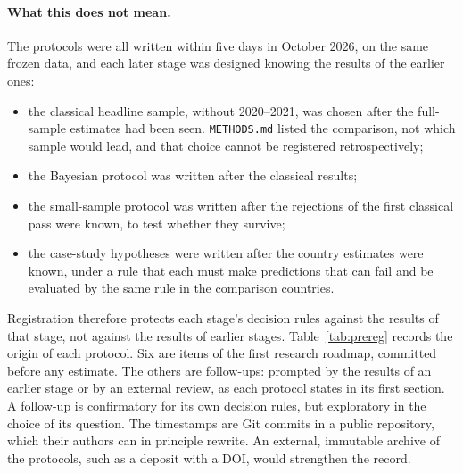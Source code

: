 \paragraph{What this does not mean.} The protocols were all written within five days in
October 2026, on the same frozen data, and each later stage was designed knowing the
results of the earlier ones:
\begin{itemize}
  \item the classical headline sample, without 2020--2021, was chosen after the
    full-sample estimates had been seen. \texttt{METHODS.md} listed the comparison, not
    which sample would lead, and that choice cannot be registered retrospectively;
  \item the Bayesian protocol was written after the classical results;
  \item the small-sample protocol was written after the  rejections
    of the first classical pass were known, to test whether they survive;
  \item the case-study hypotheses were written after the country estimates were known,
    under a rule that each must make predictions that can fail and be evaluated by the same
    rule in the comparison countries.
\end{itemize}
Registration therefore protects each stage's decision rules against the results of that
stage, not against the results of earlier stages. Table~\ref{tab:prereg} records the
origin of each protocol. Six are items of the first research roadmap, committed before
any estimate. The others are follow-ups: prompted by the results of an earlier stage or
by an external review, as each protocol states in its first section. A follow-up is
confirmatory for its own decision rules, but exploratory in the choice of its question. The timestamps are Git commits in a
public repository, which their authors can in principle rewrite. An external, immutable
archive of the protocols, such as a deposit with a DOI, would strengthen the record.

